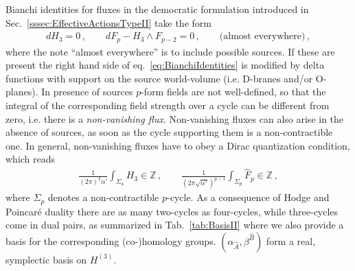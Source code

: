\documentclass[12pt,a4paper]{book}
\begin{document}
Bianchi identities for fluxes in the democratic formulation introduced in Sec.~\ref{sssec:EffectiveActionsTypeII} take the form
\begin{align}
\label{eq:BianchiIdentities}
d H_3 = 0\,, \qquad d F_p - H_3 \wedge F_{p-2} = 0\,, \qquad \text{(almost everywhere)} \,,
\end{align}
where the note ``almost everywhere'' is to include possible sources. If these are present the right hand side of eq.~\eqref{eq:BianchiIdentities} is modified by delta functions with support on the source world-volume (i.e. D-branes and/or O-planes). In presence of sources $p$-form fields are not well-defined, so that the integral of the corresponding field strength over a cycle can be different from zero, i.e. there is a \textit{non-vanishing flux}. Non-vanishing fluxes can also arise in the absence of sources, as soon as the cycle supporting them is a non-contractible one. In general, non-vanishing fluxes have to obey a Dirac quantization condition, which reads
\begin{align}
\label{eq:DiracQuantization}
\frac{1}{(2 \pi)^2 \alpha'} \int_{\Sigma_4} H_3 \in \mathbb{Z}\,, \qquad \frac{1}{\left(2 \pi \sqrt{\alpha'}\right)^{p-1}} \int_{\Sigma_p} \hat{F}_p \in \mathbb{Z}\,,
\end{align}
where $\Sigma_p$ denotes a non-contractible $p$-cycle. As a consequence of Hodge and Poincar\'e duality there are as many two-cycles as four-cycles, while three-cycles come in dual pairs, as summarized in Tab.~\ref{tab:BasisII} where we also provide a basis for the corresponding (co-)homology groups. $(\alpha_{\hat{A}}, \beta^{\hat{B}})$ form a real, symplectic basis on $H^{(3)}$.\\
\end{document}
